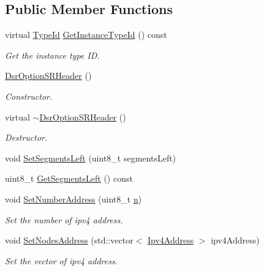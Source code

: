 \subsection*{Public Member Functions}
\begin{DoxyCompactItemize}
\item 
virtual \hyperlink{classns3_1_1TypeId}{Type\+Id} \hyperlink{classns3_1_1dsr_1_1DsrOptionSRHeader_a76b287d99651d76304b12391b33eff37}{Get\+Instance\+Type\+Id} () const 
\begin{DoxyCompactList}\small\item\em Get the instance type ID. \end{DoxyCompactList}\item 
\hyperlink{classns3_1_1dsr_1_1DsrOptionSRHeader_adcf95a445a96152dfc7229b57e17b4b1}{Dsr\+Option\+S\+R\+Header} ()
\begin{DoxyCompactList}\small\item\em Constructor. \end{DoxyCompactList}\item 
virtual \hyperlink{classns3_1_1dsr_1_1DsrOptionSRHeader_a1e90c168af642e6c7ada58f3bae72f49}{$\sim$\+Dsr\+Option\+S\+R\+Header} ()
\begin{DoxyCompactList}\small\item\em Destructor. \end{DoxyCompactList}\item 
void \hyperlink{classns3_1_1dsr_1_1DsrOptionSRHeader_ab4f451b0b38ab65c84c18d0c3cbb5fd9}{Set\+Segments\+Left} (uint8\+\_\+t segments\+Left)
\item 
uint8\+\_\+t \hyperlink{classns3_1_1dsr_1_1DsrOptionSRHeader_a9e74c96e50e33ea7090300390101a0ab}{Get\+Segments\+Left} () const 
\item 
void \hyperlink{classns3_1_1dsr_1_1DsrOptionSRHeader_a611f37babb433a5c82b393089e23be51}{Set\+Number\+Address} (uint8\+\_\+t \hyperlink{lte__link__budget__x2__handover__measures_8m_abdb05bc5a064cf642a06c83b3392f148}{n})
\begin{DoxyCompactList}\small\item\em Set the number of ipv4 address. \end{DoxyCompactList}\item 
void \hyperlink{classns3_1_1dsr_1_1DsrOptionSRHeader_aede4f60ddf515ed837f9c0d64cf8dadd}{Set\+Nodes\+Address} (std\+::vector$<$ \hyperlink{classns3_1_1Ipv4Address}{Ipv4\+Address} $>$ ipv4\+Address)
\begin{DoxyCompactList}\small\item\em Set the vector of ipv4 address. \end{DoxyCompactList}\item 

\end{DoxyCompactItemize}
